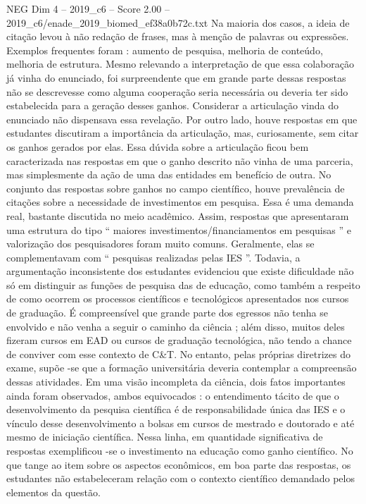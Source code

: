 \begin{textsample}{NEG Dim 4 – 2019\_c6 – Score 2.00 – 2019\_c6/enade\_2019\_biomed\_ef38a0b72c.txt}
Na maioria dos casos, a ideia de citação levou à não redação de frases, mas à menção de palavras ou expressões.
Exemplos frequentes foram : aumento de pesquisa, melhoria de conteúdo, melhoria de estrutura.
Mesmo relevando a interpretação de que essa colaboração já vinha do enunciado, foi surpreendente que em grande parte dessas respostas não se descrevesse como alguma cooperação seria necessária ou deveria ter sido estabelecida para a geração desses ganhos.
Considerar a articulação vinda do enunciado não dispensava essa revelação.
Por outro lado, houve respostas em que estudantes discutiram a importância da articulação, mas, curiosamente, sem citar os ganhos gerados por elas.
Essa dúvida sobre a articulação ficou bem caracterizada nas respostas em que o ganho descrito não vinha de uma parceria, mas simplesmente da ação de uma das entidades em benefício de outra.
No conjunto das respostas sobre ganhos no campo científico, houve prevalência de citações sobre a necessidade de investimentos em pesquisa.
Essa é uma demanda real, bastante discutida no meio acadêmico.
Assim, respostas que apresentaram uma estrutura do tipo “ maiores investimentos/financiamentos em pesquisas ” e valorização dos pesquisadores foram muito comuns.
Geralmente, elas se complementavam com “ pesquisas realizadas pelas IES ”.
Todavia, a argumentação inconsistente dos estudantes evidenciou que existe dificuldade não só em distinguir as funções de pesquisa das de educação, como também a respeito de como ocorrem os processos científicos e tecnológicos apresentados nos cursos de graduação.
É compreensível que grande parte dos egressos não tenha se envolvido e não venha a seguir o caminho da ciência ; além disso, muitos deles fizeram cursos em EAD ou cursos de graduação tecnológica, não tendo a chance de conviver com esse contexto de C\&T.
No entanto, pelas próprias diretrizes do exame, supõe -se que a formação universitária deveria contemplar a compreensão dessas atividades.
Em uma visão incompleta da ciência, dois fatos importantes ainda foram observados, ambos equivocados : o entendimento tácito de que o desenvolvimento da pesquisa científica é de responsabilidade única das IES e o vínculo desse desenvolvimento a bolsas em cursos de mestrado e doutorado e até mesmo de iniciação científica.
Nessa linha, em quantidade significativa de respostas exemplificou -se o investimento na educação como ganho científico.
No que tange ao item sobre os aspectos econômicos, em boa parte das respostas, os estudantes não estabeleceram relação com o contexto científico demandado pelos elementos da questão.

\end{textsample}
